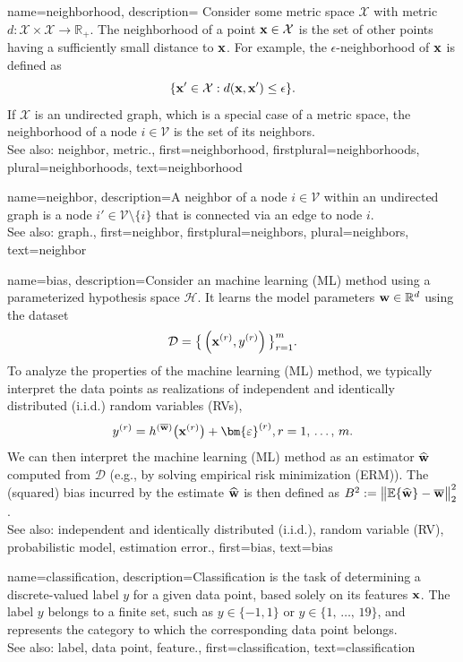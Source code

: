 { 
 {name={neighborhood},
 	description={
 	Consider some metric space $\mathcal{X}$ with metric 
	$d: \mathcal{X} \times \mathcal{X} \rightarrow \mathbb{R}_{+}$.	
 	The neighborhood of a point ${\bf x} \in \mathcal{X}$ 
 	is the set of other points having a sufficiently small distance to ${\bf x}$. 
 	For example, the $\epsilon$-neighborhood of ${\bf x}$ is defined as
 	$$ \{ {\bf x}' \in \mathcal{X} : d({\bf x}, {\bf x}') \leq \epsilon \}.$$
	If $\mathcal{X}$ is an undirected graph, which is a special case of 
 	a metric space, the neighborhood of a node $i \in \mathcal{V}$ 
 	is the set of its neighbors.
 				\\ 
 	See also: neighbor, metric.},
 	first={neighborhood},
	firstplural={neighborhoods},
 	plural={neighborhoods},
 	text={neighborhood} 
 }


{name={neighbor},
	description={A neighbor of a node $i \in \mathcal{V}$ 
		within an undirected graph is a node $i' \in \mathcal{V} \setminus \{ i\}$ 
		that is connected via an edge to node $i$.
				\\ 
		See also: graph.},
	first={neighbor},
	firstplural={neighbors}, 
	plural={neighbors}, 
	text={neighbor} 
}

{name={bias},
	description={Consider an machine learning (ML) method using a parameterized hypothesis space $\mathcal{H}$. 
		It learns the model parameters ${\bf w} \in \mathbb{R}^{d}$ using the dataset 
		$$\mathcal{D}=\big\{ \left( {\bf x}^{(r)},y^{(r)} \right) \big\}_{r=1}^{m}.$$ 
		To analyze the properties of the machine learning (ML) method, we typically interpret the data points as realizations of independent and identically distributed (i.i.d.) random variables (RVs), 
		$$y^{(r)} = h^{(\overline{{\bf w}})}\big( {\bf x}^{(r)} \big) + \bm{\varepsilon}^{(r)}, r=1, \,\ldots, \,m.$$ 
		We can then interpret the machine learning (ML) method as an estimator $\widehat{{\bf w}}$ 
		computed from $\mathcal{D}$ (e.g., by solving empirical risk minimization (ERM)). The (squared) bias incurred by 
		the estimate $\widehat{{\bf w}}$ is then defined as $B^{2} := \big\| \mathbb{E}  \{ \widehat{{\bf w}}  \}- \overline{{\bf w}}\big\|_{2}^{2}$.
					\\ 
		See also: independent and identically distributed (i.i.d.), random variable (RV), probabilistic model, estimation error.},
	first={bias},
	text={bias} 
}

{name={classification},
	description={Classification is the task of determining a 
 		discrete-valued label $y$ for a given data point, based solely on its 
 		features ${\bf x}$. The label $y$ belongs to a finite set, such as 
 		$y \in \{-1,1\}$ or $y \in \{1, \,\ldots, \,19\}$, and represents the 
 		category to which the corresponding data point belongs.
				\\ 
		See also: label, data point, feature.},
	first={classification},
	text={classification} 
}


}
